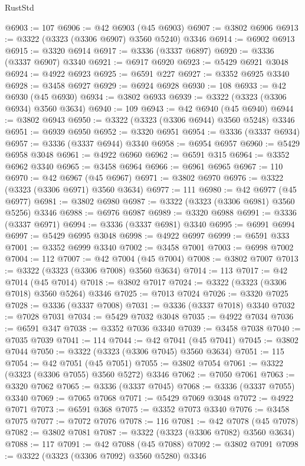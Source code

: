 \begin{lexlean}{RustStd}
\begin{coremodule}
@6903 := 107
@6906 := @42 @6903 (@45 @6903)
@6907 := @3802 @6906
@6913 := @3322 (@3323 (@3306 @6907) @3560 @5240) @3346
@6914 := @6902 @6913
@6915 := @3320 @6914
@6917 := @3336 (@3337 @6897)
@6920 := @3336 (@3337 @6907) @3340
@6921 := @6917 @6920
@6923 := @5429 @6921 @3048
@6924 := @4922 @6923
@6925 := @6591 @227
@6927 := @3352 @6925 @3340
@6928 := @3458 @6927
@6929 := @6924 @6928
@6930 := 108
@6933 := @42 @6930 (@45 @6930)
@6934 := @3802 @6933
@6939 := @3322 (@3323 (@3306 @6934) @3560 @3634)
@6940 := 109
@6943 := @42 @6940 (@45 @6940)
@6944 := @3802 @6943
@6950 := @3322 (@3323 (@3306 @6944) @3560 @5248) @3346
@6951 := @6939 @6950
@6952 := @3320 @6951
@6954 := @3336 (@3337 @6934)
@6957 := @3336 (@3337 @6944) @3340
@6958 := @6954 @6957
@6960 := @5429 @6958 @3048
@6961 := @4922 @6960
@6962 := @6591 @315
@6964 := @3352 @6962 @3340
@6965 := @3458 @6964
@6966 := @6961 @6965
@6967 := 110
@6970 := @42 @6967 (@45 @6967)
@6971 := @3802 @6970
@6976 := @3322 (@3323 (@3306 @6971) @3560 @3634)
@6977 := 111
@6980 := @42 @6977 (@45 @6977)
@6981 := @3802 @6980
@6987 := @3322 (@3323 (@3306 @6981) @3560 @5256) @3346
@6988 := @6976 @6987
@6989 := @3320 @6988
@6991 := @3336 (@3337 @6971)
@6994 := @3336 (@3337 @6981) @3340
@6995 := @6991 @6994
@6997 := @5429 @6995 @3048
@6998 := @4922 @6997
@6999 := @6591 @333
@7001 := @3352 @6999 @3340
@7002 := @3458 @7001
@7003 := @6998 @7002
@7004 := 112
@7007 := @42 @7004 (@45 @7004)
@7008 := @3802 @7007
@7013 := @3322 (@3323 (@3306 @7008) @3560 @3634)
@7014 := 113
@7017 := @42 @7014 (@45 @7014)
@7018 := @3802 @7017
@7024 := @3322 (@3323 (@3306 @7018) @3560 @5264) @3346
@7025 := @7013 @7024
@7026 := @3320 @7025
@7028 := @3336 (@3337 @7008)
@7031 := @3336 (@3337 @7018) @3340
@7032 := @7028 @7031
@7034 := @5429 @7032 @3048
@7035 := @4922 @7034
@7036 := @6591 @347
@7038 := @3352 @7036 @3340
@7039 := @3458 @7038
@7040 := @7035 @7039
@7041 := 114
@7044 := @42 @7041 (@45 @7041)
@7045 := @3802 @7044
@7050 := @3322 (@3323 (@3306 @7045) @3560 @3634)
@7051 := 115
@7054 := @42 @7051 (@45 @7051)
@7055 := @3802 @7054
@7061 := @3322 (@3323 (@3306 @7055) @3560 @5272) @3346
@7062 := @7050 @7061
@7063 := @3320 @7062
@7065 := @3336 (@3337 @7045)
@7068 := @3336 (@3337 @7055) @3340
@7069 := @7065 @7068
@7071 := @5429 @7069 @3048
@7072 := @4922 @7071
@7073 := @6591 @368
@7075 := @3352 @7073 @3340
@7076 := @3458 @7075
@7077 := @7072 @7076
@7078 := 116
@7081 := @42 @7078 (@45 @7078)
@7082 := @3802 @7081
@7087 := @3322 (@3323 (@3306 @7082) @3560 @3634)
@7088 := 117
@7091 := @42 @7088 (@45 @7088)
@7092 := @3802 @7091
@7098 := @3322 (@3323 (@3306 @7092) @3560 @5280) @3346

\end{coremodule}
\end{lexlean}
